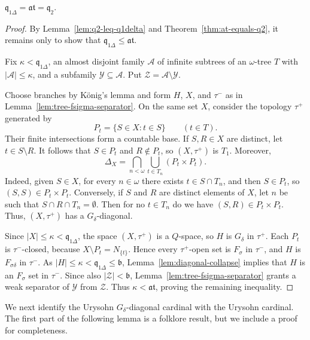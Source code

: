 \begin{thm}\label{thm:q1delta-equals-at}
$\mathfrak q_{1\Delta}=\mathfrak{at}=\mathfrak q_2$.
\end{thm}

\begin{proof}
By Lemma~\ref{lem:q2-leq-q1delta} and Theorem~\ref{thm:at-equals-q2},
it remains only to show that $\mathfrak q_{1\Delta}\leq\mathfrak{at}$.

Fix $\kappa<\mathfrak q_{1\Delta}$, an almost disjoint family
$\mathcal A$ of infinite subtrees of an $\omega$-tree $T$ with
$|\mathcal A|\leq\kappa$, and a subfamily $\mathcal Y\subseteq\mathcal A$.
Put $\mathcal Z=\mathcal A\setminus\mathcal Y$.

Choose branches by König's lemma and form $H$, $X$, and $\tau^-$ as in
Lemma~\ref{lem:tree-fsigma-separator}. On the same set $X$, consider
the topology $\tau^+$ generated by
\[
  P_t=\{S\in X:t\in S\}\qquad(t\in T).
\]
Their finite intersections form a countable base. If $S, R\in X$ are distinct,
let $t\in S\setminus R$.
It follows that $S\in P_t$ and $R\notin P_t$, so $(X,\tau^+)$ is $T_1$.
Moreover,
\begin{equation}\label{eq:positive-tree-diagonal}
  \Delta_X
  =\bigcap_{n<\omega}\bigcup_{t\in T_n}(P_t\times P_t).
\end{equation}
Indeed, given $S \in X$, for every $n \in \omega$ there exists $t \in S \cap T_n$,
and then $S \in P_t$, so $(S,S) \in P_t \times P_t$.
Conversely, if $S$ and $R$ are distinct elements of $X$, let $n$ be such that $S\cap R\cap T_n=\emptyset$.
Then for no $t\in T_n$ do we have $(S,R)\in P_t\times P_t$.
Thus, $(X,\tau^+)$ has a $G_\delta$-diagonal.

Since $|X|\leq\kappa<\mathfrak q_{1\Delta}$, the space $(X,\tau^+)$
is a $Q$-space, so $H$ is $G_\delta$ in $\tau^+$.
Each $P_t$ is $\tau^-$-closed, because $X\setminus P_t=N_{\{t\}}$.
Hence every $\tau^+$-open set is $F_\sigma$ in $\tau^-$, and $H$ is
$F_{\sigma\delta}$ in $\tau^-$.
As $|H|\leq\kappa<\mathfrak q_{1\Delta}\leq\mathfrak b$,
Lemma~\ref{lem:diagonal-collapse} implies that $H$ is an $F_\sigma$ set in $\tau^-$.
Since also $|\mathcal Z|<\mathfrak b$, Lemma~\ref{lem:tree-fsigma-separator}
grants a weak separator of $\mathcal Y$ from $\mathcal Z$.
Thus $\kappa<\mathfrak{at}$, proving the remaining inequality.
\end{proof}

We next identify the Urysohn $G_\delta$-diagonal cardinal with the Urysohn cardinal.
The first part of the following lemma is a folklore result, but we include a proof for completeness.

